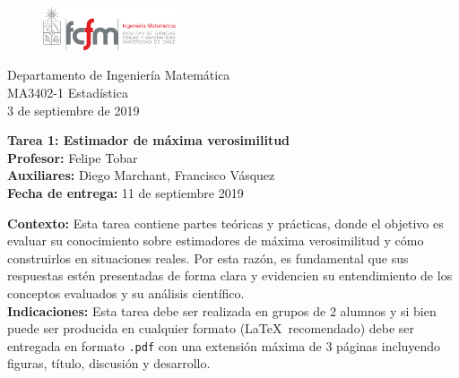\documentclass[11pt]{article}
\newcommand{\tarea}[5]{\Large \textbf{Tarea #1: #2}\\ \normalsize \textbf{Profesor: } #3\\ \textbf{Auxiliares: }#4\\ \textbf{Fecha de entrega: }#5}
\begin{document}
\begin{figure} %
    \vspace{-5mm}
    \includegraphics[width=0.35\textwidth]{dim.pdf}
\end{figure}
\noindent Departamento de Ingeniería Matemática\\ 
MA3402-1 Estadística\\ 
3 de septiembre de 2019

\hfill\break
\begin{center}
\tarea{1}{Estimador de máxima verosimilitud}{Felipe Tobar}{Diego Marchant, Francisco Vásquez}{11 de septiembre 2019}
\end{center}
\textbf{Contexto:} Esta tarea contiene partes teóricas y prácticas, donde el objetivo es evaluar su conocimiento sobre estimadores de máxima verosimilitud y cómo construirlos en situaciones reales. Por esta razón, es fundamental que sus respuestas estén presentadas de forma clara y evidencien su entendimiento de los conceptos evaluados y su análisis científico. \\
\textbf{Indicaciones:} Esta tarea debe ser realizada en grupos de 2 alumnos y si bien puede ser producida en cualquier formato (\LaTeX\  recomendado) debe ser entregada en formato \texttt{.pdf} con una extensión máxima de 3 páginas incluyendo figuras, título, discusión y desarrollo. 
\end{document}
